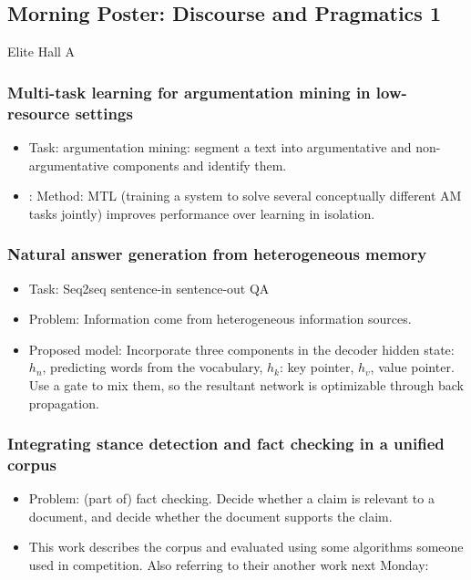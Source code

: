 \subsection{Morning Poster:  Discourse and Pragmatics 1}
Elite Hall A

\subsubsection{\cite{Schulz2018Multi-Task} Multi-task learning for argumentation mining in low-resource settings}
\begin{itemize}
	\item Task: argumentation mining: segment a text into argumentative and non-argumentative components and identify them. 
	\item: Method: MTL (training a system to solve several conceptually different AM tasks jointly) improves performance over learning in isolation.
\end{itemize}

\subsubsection{\cite{Fu2018Natural} Natural answer generation from heterogeneous memory}
\begin{itemize}
	\item Task: Seq2seq sentence-in sentence-out QA
	\item Problem: Information come from heterogeneous information sources.
	\item Proposed model: Incorporate three components in the decoder hidden state: $h_n$, predicting words from the vocabulary, $h_k$: key pointer, $h_v$, value pointer. Use a gate to mix them, so the resultant network is optimizable through back propagation.
\end{itemize}


\subsubsection{\cite{Baly2018Integrating} Integrating stance detection and fact checking in a unified corpus}
\begin{itemize}
	\item Problem: (part of) fact checking. Decide whether a claim is relevant to a document, and decide whether the document supports the claim.
	\item This work describes the corpus and evaluated using some algorithms someone used in competition. Also referring to their another work next Monday: \cite{Mohtarami2018Automatic}
\end{itemize}

